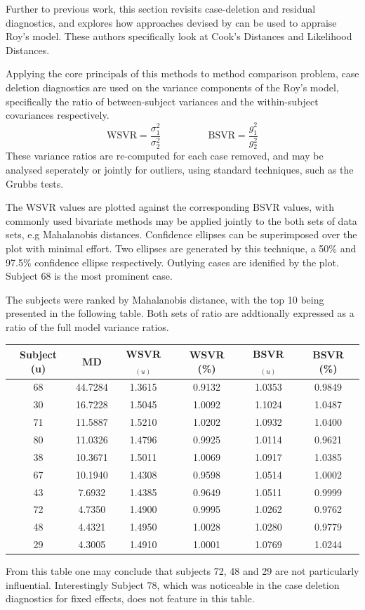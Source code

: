 Further to previous work, this section revisits case-deletion and residual diagnostics, and explores how approaches devised by \citet{Galecki} can be used to appraise Roy's model. These authors specifically look at Cook's Distances and Likelihood Distances.

Applying the core principals of this methods to method comparison problem, case deletion diagnostics are used on the variance components of the Roy's model, specifically the ratio of between-subject variances and the within-subject covariances respectively.
\[ \mbox{WSVR} = \frac{\sigma^2_1}{\sigma^2_2} \phantom{makespace}  \mbox{BSVR} = \frac{g^2_1}{g^2_2} \]
These variance ratios are re-computed for each case removed, and may be analysed seperately or jointly for outliers, using standard techniques, such as the Grubbs tests.


The WSVR values are plotted against the corresponding BSVR values, with commonly used bivariate methods may be applied jointly to the both sets of data sets, e.g Mahalanobis distances. Confidence ellipses can be superimposed over the plot with minimal effort. Two ellipses are generated by this technique, a 50\% and 97.5\% confidence ellipse respectively. Outlying cases are idenified by the plot. Subject 68 is the most prominent case.

The subjects were ranked by Mahalanobis distance, with the top 10 being presented in the following table. Both sets of ratio are addtionally expressed as a ratio of the full model variance ratios.
\begin{center}
	\begin{tabular}{|c|c|c|c|c|c|}
		\hline
		Subject (u) &  MD & WSVR$_{(u)}$ & WSVR (\%) & BSVR$_{(u)}$   & BSVR (\%)     \\ \hline \hline
		68 & 44.7284   & 1.3615  & 0.9132   & 1.0353  & 0.9849 \\ \hline
		30 & 16.7228   & 1.5045  & 1.0092   & 1.1024  & 1.0487 \\ \hline
		71 & 11.5887   & 1.5210  & 1.0202   & 1.0932  & 1.0400 \\ \hline
		80 & 11.0326   & 1.4796  & 0.9925   & 1.0114  & 0.9621 \\ \hline
		38 & 10.3671   & 1.5011  & 1.0069   & 1.0917  & 1.0385 \\ \hline
		67 & 10.1940   & 1.4308  & 0.9598   & 1.0514  & 1.0002 \\ \hline
		43  & 7.6932   & 1.4385  & 0.9649   & 1.0511  & 0.9999 \\ \hline
		72  & 4.7350   & 1.4900  & 0.9995   & 1.0262  & 0.9762 \\ \hline
		48  & 4.4321   & 1.4950  & 1.0028   & 1.0280  & 0.9779 \\ \hline
		29  & 4.3005   & 1.4910  & 1.0001   & 1.0769  & 1.0244 \\ \hline
	\end{tabular}
\end{center}
From this table one may conclude that subjects 72, 48 and 29 are not particularly influential. Interestingly Subject 78, which was noticeable in the case deletion diagnostics for fixed effects, does not feature in this table.

